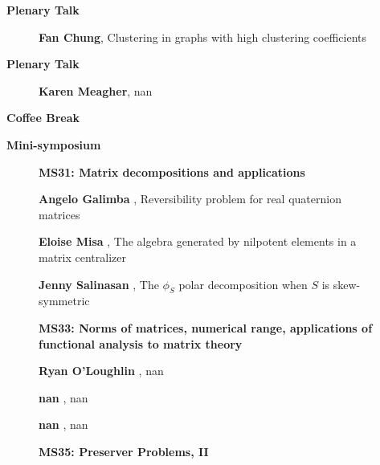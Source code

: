 \documentclass[ILAS2025-program.tex]{subfiles}
\begin{document}
    \begin{description}
    \item[] \textbf{Plenary Talk} 
    \begin{description}
        \item[] \textbf{Fan Chung}, Clustering in graphs with high clustering coefficients
        \end{description}
        \item[] \textbf{Plenary Talk} 
    \begin{description}
        \item[] \textbf{Karen Meagher}, nan
        \end{description}
        \item[] \textbf{Coffee Break} 
    \item[] \textbf{Mini-symposium} 
    \begin{description}
    \item[] {\color{mstitle}\textbf{MS31: Matrix decompositions and applications}} 
    \item[] \textbf{Angelo Galimba} , Reversibility problem for real quaternion matrices
        \item[] \textbf{Eloise Misa} , The algebra generated by nilpotent elements in a matrix centralizer
        \item[] \textbf{Jenny Salinasan} , The $\phi_S$ polar decomposition when $S$ is skew-symmetric
        \end{description}
    \begin{description}
    \item[] {\color{mstitle}\textbf{MS33: Norms of matrices, numerical range, applications of functional analysis to matrix theory}} 
    \item[] \textbf{Ryan O'Loughlin} , nan
        \item[] \textbf{nan} , nan
        \item[] \textbf{nan} , nan
        \end{description}
    \begin{description}
    \item[] {\color{mstitle}\textbf{MS35: Preserver Problems, II}} 

\end{description}
\end{description}
\end{document}
